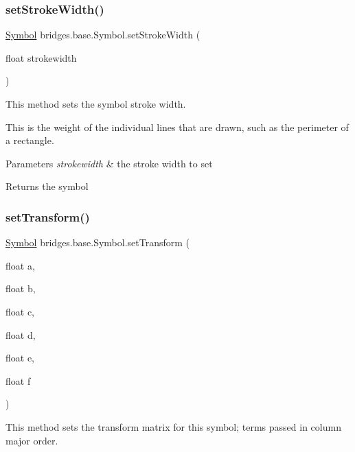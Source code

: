 \subsubsection{\texorpdfstring{set\+Stroke\+Width()}{setStrokeWidth()}}
{\footnotesize\ttfamily \hyperlink{classbridges_1_1base_1_1_symbol}{Symbol} bridges.\+base.\+Symbol.\+set\+Stroke\+Width (\begin{DoxyParamCaption}\item[{float}]{strokewidth }\end{DoxyParamCaption})}



This method sets the symbol stroke width. 

This is the weight of the individual lines that are drawn, such as the perimeter of a rectangle.


\begin{DoxyParams}{Parameters}
{\em strokewidth} & the stroke width to set \\
\hline
\end{DoxyParams}
\begin{DoxyReturn}{Returns}
the symbol 
\end{DoxyReturn}
\mbox{\label{classbridges_1_1base_1_1_symbol_ac279dbc8b1e22e3aa64c8b529dbc46d2}} 
\subsubsection{\texorpdfstring{set\+Transform()}{setTransform()}}
{\footnotesize\ttfamily \hyperlink{classbridges_1_1base_1_1_symbol}{Symbol} bridges.\+base.\+Symbol.\+set\+Transform (\begin{DoxyParamCaption}\item[{float}]{a,  }\item[{float}]{b,  }\item[{float}]{c,  }\item[{float}]{d,  }\item[{float}]{e,  }\item[{float}]{f }\end{DoxyParamCaption})}

This method sets the transform matrix for this symbol; terms passed in column major order.


